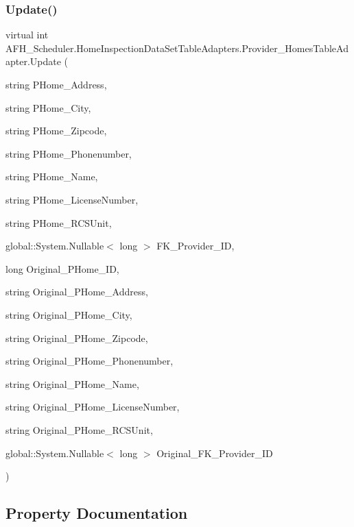 \subsubsection{Update()\hspace{0.1cm}{\footnotesize\ttfamily [6/6]}}
{\footnotesize\ttfamily virtual int A\+F\+H\+\_\+\+Scheduler.\+Home\+Inspection\+Data\+Set\+Table\+Adapters.\+Provider\+\_\+\+Homes\+Table\+Adapter.\+Update (\begin{DoxyParamCaption}\item[{string}]{P\+Home\+\_\+\+Address,  }\item[{string}]{P\+Home\+\_\+\+City,  }\item[{string}]{P\+Home\+\_\+\+Zipcode,  }\item[{string}]{P\+Home\+\_\+\+Phonenumber,  }\item[{string}]{P\+Home\+\_\+\+Name,  }\item[{string}]{P\+Home\+\_\+\+License\+Number,  }\item[{string}]{P\+Home\+\_\+\+R\+C\+S\+Unit,  }\item[{global\+::\+System.\+Nullable$<$ long $>$}]{F\+K\+\_\+\+Provider\+\_\+\+ID,  }\item[{long}]{Original\+\_\+\+P\+Home\+\_\+\+ID,  }\item[{string}]{Original\+\_\+\+P\+Home\+\_\+\+Address,  }\item[{string}]{Original\+\_\+\+P\+Home\+\_\+\+City,  }\item[{string}]{Original\+\_\+\+P\+Home\+\_\+\+Zipcode,  }\item[{string}]{Original\+\_\+\+P\+Home\+\_\+\+Phonenumber,  }\item[{string}]{Original\+\_\+\+P\+Home\+\_\+\+Name,  }\item[{string}]{Original\+\_\+\+P\+Home\+\_\+\+License\+Number,  }\item[{string}]{Original\+\_\+\+P\+Home\+\_\+\+R\+C\+S\+Unit,  }\item[{global\+::\+System.\+Nullable$<$ long $>$}]{Original\+\_\+\+F\+K\+\_\+\+Provider\+\_\+\+ID }\end{DoxyParamCaption})\hspace{0.3cm}{\ttfamily [virtual]}}



\subsection{Property Documentation}
\mbox{\label{class_a_f_h___scheduler_1_1_home_inspection_data_set_table_adapters_1_1_provider___homes_table_adapter_ad2af3b9f3c4adab4de9999e7266bdc70}} 
